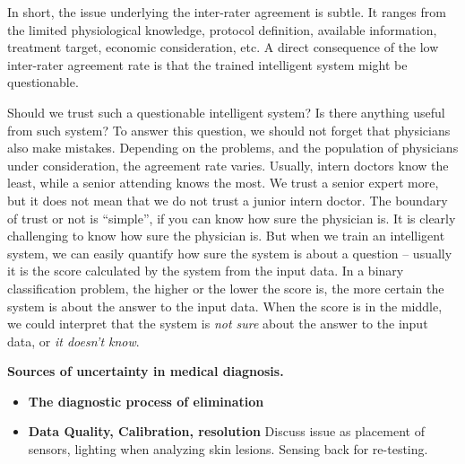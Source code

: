\documentclass[9pt,twocolumn,twoside]{pnas-new}
\begin{document}
   {\color{blue} In short, the issue underlying the inter-rater agreement is
  subtle. It ranges from the limited physiological knowledge, protocol definition, available
  information, treatment target, economic consideration, etc. A direct consequence of the low inter-rater agreement rate is that the trained intelligent system might be questionable. 
  
Should we trust such a questionable intelligent system? Is there anything useful from such system? To answer this question, we should not forget that physicians also make mistakes. Depending on the problems, and the population of physicians under consideration, the agreement rate varies. Usually, intern doctors know the least, while a senior attending knows the most. We trust a senior expert more, but it does not mean that we do not trust a junior intern doctor. The boundary of trust or not is ``simple'', if you can know how sure the physician is. It is clearly challenging to know how sure the physician is. But when we train an intelligent system, we can easily quantify how sure the system is about a question -- usually it is the score calculated by the system from the input data. In a binary classification problem, the higher or the lower the score is, the more certain the system is about the answer to the input data. When the score is in the middle, we could interpret that the system is {\em not sure} about the answer to the input data, or {\em it doesn't know}.

  }

\iffalse
  \Medicine{Inter-Rater agreement}{
  A direct consequence of this low inter-rater agreement is a
  questionable trained ``artificial intelligence''. It is possible
  that we magically obtain a dataset that contains information that is
  sufficient for the decision making, while the information is too
  subtle so that it is not considered in the protocol, and we also
  magically obtain labels from a magical master that can see though
  all the information and provide the correct decision. However, by
  doing a simple math, we shall not count on such a magic and should
  come back to the protocol itself.

  \yoav{ Can you describe a particular interesting / illuminating /
    convincing case?}
}
\fi


{\bf Sources of uncertainty in medical diagnosis.}
\begin{itemize}
  \item{\bf The diagnostic process of elimination}
  \item{\bf Data Quality, Calibration, resolution} Discuss issue as
    placement of sensors, lighting when analyzing skin lesions. Sensing back for re-testing.
  \end{itemize}
\end{document}
